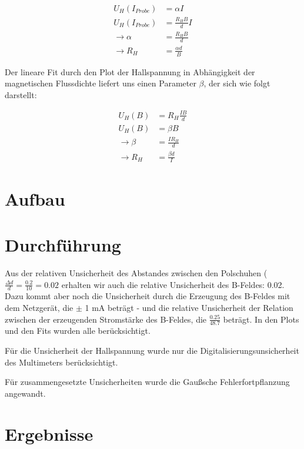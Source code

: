 \documentclass[12pt,a4paper,twopage]{article}
\begin{document}
\begin{equation}
\label{afit}
\begin{split}
U_H(I_{Probe})& = \alpha I \\
U_H(I_{Probe})& = \frac{R_H B}{d} I \\
\rightarrow \alpha & = \frac{R_H B}{d} \\
\rightarrow R_H & = \frac{\alpha d}{B}
\end{split}
\end{equation}

Der lineare Fit durch den Plot der Hallspannung in Abhängigkeit der magnetischen Flussdichte liefert uns einen Parameter $\beta$, der sich wie folgt darstellt:

\begin{equation}\label{bfit}
\begin{split}
U_H(B)& = R_H \frac{I B}{d} \\
U_H(B)& = \beta B \\
\rightarrow \beta & = \frac{I R_H}{d} \\
\rightarrow R_H & = \frac{\beta d}{I}
\end{split}
\end{equation}



\section{Aufbau}

\section{Durchführung}
Aus der relativen Unsicherheit des Abstandes zwischen den Polschuhen ($\frac{\Delta d}{d}= \frac{0.2}{10} = 0.02 $ erhalten wir auch die relative Unsicherheit des B-Feldes:  0.02. Dazu kommt aber noch die Unsicherheit durch die Erzeugung des B-Feldes mit dem Netzgerät, die $\pm$ 1 mA beträgt - und die relative Unsicherheit der Relation zwischen der erzeugenden Stromstärke des B-Feldes, die $\frac{0.25}{48.7}$ beträgt. In den Plots und den Fits wurden alle berücksichtigt. 

Für die Unsicherheit der Hallspannung wurde nur die Digitalisierungsunsicherheit des Multimeters berücksichtigt. 

Für zusammengesetzte Unsicherheiten wurde die Gaußsche Fehlerfortpflanzung angewandt.
\section{Ergebnisse}
\end{document}
